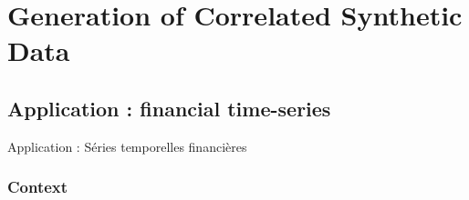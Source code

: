 
\chapter{Generation of Correlated Synthetic Data} %

\label{app:syntheticdata} %





\section*{Application : financial time-series}{Application : Séries temporelles financières}


\subsection*{Context}

